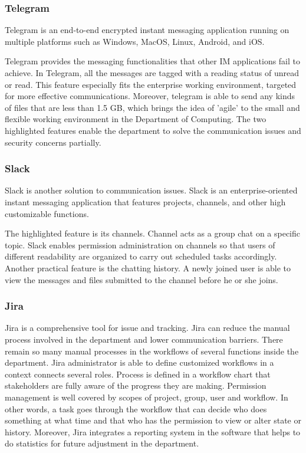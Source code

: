 \subsubsection{Telegram}

Telegram is an end-to-end encrypted instant messaging application running on multiple platforms such as Windows, MacOS, Linux, Android, and iOS.

Telegram provides the messaging functionalities that other IM applications fail to achieve. In Telegram, all the messages are tagged with a reading status of unread or read. This feature especially fits the enterprise working environment, targeted for more effective communications. Moreover, telegram is able to send any kinds of files that are less than 1.5 GB, which brings the idea of 'agile' to the small and flexible working environment in the Department of Computing. The two highlighted features enable the department to solve the communication issues and security concerns partially.

\subsubsection{Slack}
Slack is another solution to communication issues. Slack is an enterprise-oriented instant messaging application that features projects, channels, and other high customizable functions.

The highlighted feature is its channels. Channel acts as a group chat on a specific topic. Slack enables permission administration on channels so that users of different readability are organized to carry out scheduled tasks accordingly. Another practical feature is the chatting history. A newly joined user is able to view the messages and files submitted to the channel before he or she joins.

\subsubsection{Jira}

Jira is a comprehensive tool for issue and tracking. Jira can reduce the manual process involved in the department and lower communication barriers. There remain so many manual processes in the workflows of several functions inside the department. Jira administrator is able to define customized workflows in a context connects several roles. Process is defined in a workflow chart that stakeholders are fully aware of the progress they are making. Permission management is well covered by scopes of project, group, user and workflow. In other words, a task goes through the workflow that can decide who does something at what time and that who has the permission to view or alter state or history. Moreover, Jira integrates a reporting system in the software that helps to do statistics for future adjustment in the department.

